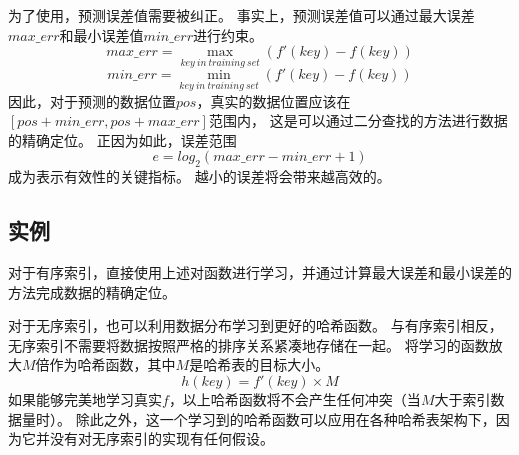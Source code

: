 为了使用{\rmi}，预测误差值需要被纠正。
事实上，预测误差值可以通过最大误差$max\_err$和最小误差值$min\_err$进行约束。
\[ max\_err = \max_{key\ in\ training\ set}(f'(key)-f(key)) \]
\[ min\_err = \min_{key\ in\ training\ set}(f'(key)-f(key)) \]
因此，对于{\rmi}预测的数据位置$pos$，真实的数据位置应该在$[pos + min\_err, pos + max\_err]$范围内，
这是可以通过二分查找的方法进行数据的精确定位。
正因为如此，{\model}误差范围
$$e = log_2(max\_err - min\_err + 1)$$
成为表示{\rmi}有效性的关键指标。
越小的{\model}误差将会带来越高效的{\rmi}。


\subsection{{\li}实例}

对于有序索引，{\li}直接使用上述{\rmi}对{\cdf}函数进行学习，并通过计算最大误差和最小误差的方法完成数据的精确定位。

对于无序索引，{\li}也可以利用数据分布学习到更好的哈希函数。
与有序索引相反，无序索引不需要将数据按照严格的排序关系紧凑地存储在一起。
{\li}将学习的{\cdf}函数放大$M$倍作为哈希函数，其中$M$是哈希表的目标大小。
\[ h(key) = f'(key) \times M \]
如果{\rmi}能够完美地学习真实{\cdf}$f$，以上哈希函数将不会产生任何冲突（当$M$大于索引数据量时）。
除此之外，这一个学习到的哈希函数可以应用在各种哈希表架构下，因为它并没有对无序索引的实现有任何假设。


